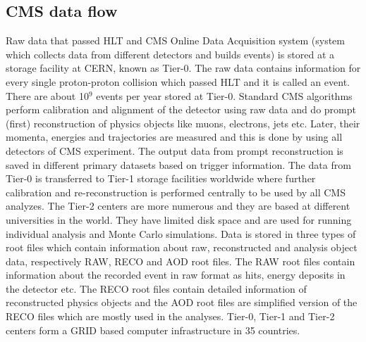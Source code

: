 \subsection{CMS data flow}
Raw data that passed HLT and CMS Online Data Acquisition system (system which collects
data from different detectors and builds events) is stored at a storage facility at CERN, known
as Tier-0. The raw data contains information for every single proton-proton collision which
passed HLT and it is called an event. There are about 10$^9$ events per year stored at Tier-0.
Standard CMS algorithms perform calibration and alignment of the detector using raw data
and do prompt (first) reconstruction of physics objects like muons, electrons, jets etc. Later,
their momenta, energies and trajectories are measured and this is done by using all detectors
of CMS experiment.
The output data from prompt reconstruction is saved in different primary datasets based on
trigger information.
The data from Tier-0 is transferred to Tier-1 storage facilities worldwide where further calibration
and re-reconstruction is performed centrally to be used by all CMS analyzes. The
Tier-2 centers are more numerous and they are based at different universities in the world.
They have limited disk space and are used for running individual analysis and Monte Carlo
simulations.
Data is stored in three types of root files which contain information about raw, reconstructed
and analysis object data, respectively RAW, RECO and AOD root files. The RAW root files
contain information about the recorded event in raw format as hits, energy deposits in the detector
etc. The RECO root files contain detailed information of reconstructed physics objects
and the AOD root files are simplified version of the RECO files which are mostly used in the
analyses.
Tier-0, Tier-1 and Tier-2 centers form a GRID \cite{LHCGrid} based computer infrastructure in 35 countries.

